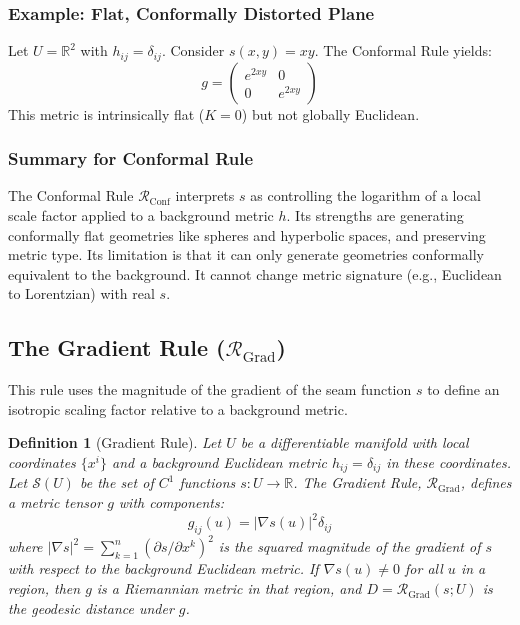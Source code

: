 \documentclass[twoside,twocolumn]{article}
\newtheorem{definition}{Definition}[subsection] %
\begin{document}
\subsubsection{Example: Flat, Conformally Distorted Plane}
Let $U = \mathbb{R}^2$ with $h_{ij} = \delta_{ij}$. Consider $s(x, y) = xy$. The Conformal Rule yields:
$$ g = \begin{pmatrix} e^{2xy} & 0 \\ 0 & e^{2xy} \end{pmatrix} $$
This metric is intrinsically flat ($K=0$) but not globally Euclidean.

\subsubsection{Summary for Conformal Rule}
The Conformal Rule $\mathcal{R}_{\text{Conf}}$ interprets $s$ as controlling the logarithm of a local scale factor applied to a background metric $h$. Its strengths are generating conformally flat geometries like spheres and hyperbolic spaces, and preserving metric type. Its limitation is that it can only generate geometries conformally equivalent to the background. It cannot change metric signature (e.g., Euclidean to Lorentzian) with real $s$.

\subsection{The Gradient Rule (\( \mathcal{R}_{\text{Grad}} \))}
\setcounter{definition}{0}

This rule uses the magnitude of the gradient of the seam function $s$ to define an isotropic scaling factor relative to a background metric.

\begin{definition}[Gradient Rule]
Let \( U \) be a differentiable manifold with local coordinates \( \{x^i\} \) and a background Euclidean metric \( h_{ij} = \delta_{ij} \) in these coordinates. Let \( \mathcal{S}(U) \) be the set of \( C^1 \) functions \( s: U \to \mathbb{R} \). The \emph{Gradient Rule}, \( \mathcal{R}_{\text{Grad}} \), defines a metric tensor \( g \) with components:
\begin{equation}
g_{ij}(u) = |\nabla s(u)|^2 \delta_{ij}
\label{eq:gradient_rule}
\end{equation}
where \( |\nabla s|^2 = \sum_{k=1}^n (\partial s / \partial x^k)^2 \) is the squared magnitude of the gradient of \( s \) with respect to the background Euclidean metric. If \( \nabla s(u) \neq 0 \) for all \( u \) in a region, then \( g \) is a Riemannian metric in that region, and \( D = \mathcal{R}_{\text{Grad}}(s; U) \) is the geodesic distance under \( g \).
\end{definition}
\end{document}
